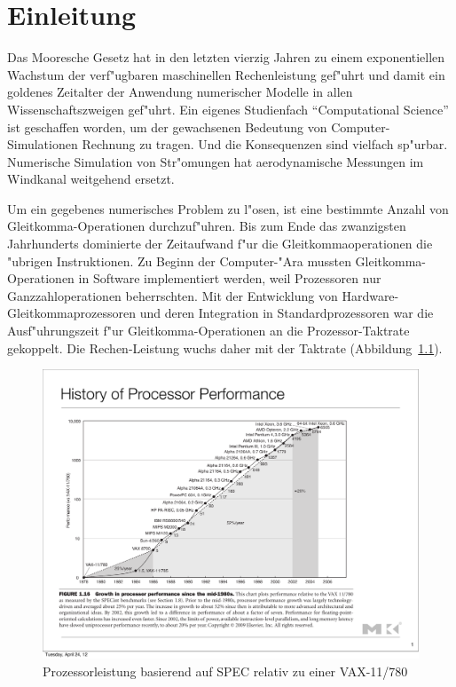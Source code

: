 \chapter{Einleitung}
Das Mooresche Gesetz hat in den letzten vierzig Jahren zu einem
exponentiellen Wachstum der verf"ugbaren maschinellen Rechenleistung
gef"uhrt und damit ein goldenes Zeitalter der Anwendung numerischer
Modelle in allen Wissenschaftszweigen gef"uhrt.
Ein eigenes Studienfach ``Computational Science'' ist geschaffen worden,
um der gewachsenen Bedeutung von Computer-Simulationen Rechnung zu
tragen. Und die Konsequenzen sind vielfach sp"urbar.
Numerische Simulation von Str"omungen hat aerodynamische Messungen
im Windkanal weitgehend ersetzt.

Um ein gegebenes numerisches Problem zu l"osen, ist eine bestimmte
Anzahl von Gleit\-komma-Operationen durchzuf"uhren.
Bis zum Ende das zwanzigsten Jahrhunderts dominierte der Zeitaufwand f"ur
die Gleitkommaoperationen die "ubrigen Instruktionen.
Zu Beginn der Computer-"Ara mussten Gleitkomma-Operationen in Software
implementiert werden, weil Prozessoren nur Ganzzahloperationen 
beherrschten. Mit der Entwicklung von Hardware-Gleitkommaprozessoren
und deren Integration in Standardprozessoren war die Ausf"uhrungszeit
f"ur Gleitkomma-Operationen an die Prozessor-Taktrate gekoppelt.
Die Rechen-Leistung wuchs daher mit der Taktrate
(Abbildung~\ref{processorperformance}).
\begin{figure}
\begin{center}
\includegraphics[width=\hsize]{images/processorperformance.pdf}
\end{center}
\caption{Prozessorleistung basierend auf SPEC relativ zu einer VAX-11/780}
\label{processorperformance}
\end{figure}

